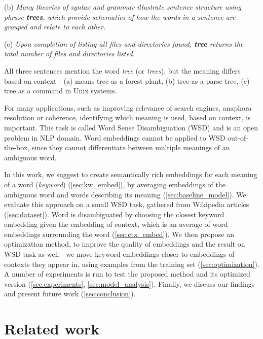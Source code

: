 \documentclass{llncs}
\begin{document}
(b) \textit{Many theories of syntax and grammar illustrate sentence structure using phrase \textbf{trees}, which provide schematics of how the words in a sentence are grouped and relate to each other.}

(c) \textit{Upon completion of listing all files and directories found, \textbf{tree} returns the total number of files and directories listed.}
\medskip

All three sentences mention the word \textit{tree} (or \textit{trees}), but the meaning differs based on context - (a) means tree as a forest plant, (b) tree as a parse tree, (c) tree as a command in Unix systems.

For many applications, such as improving relevance of search engines, anaphora resolution or coherence, identifying which meaning is used, based on context, is important.
This task is called Word Sense Disambiguation (WSD) and is an open problem in NLP domain.
Word embeddings cannot be applied to WSD out-of-the-box, since they cannot differentiate between multiple meanings of an ambiguous word.

In this work, we suggest to create semantically rich embeddings for each meaning of a word (\textit{keyword}) (\ref{sec:kw_embed}), by averaging embeddings of the ambiguous word and words describing its meaning (\ref{sec:baseline_model}).
We evaluate this approach on a small WSD task, gathered from Wikipedia articles (\ref{sec:dataset}).
Word is disambiguated by choosing the closest keyword embedding given the embedding of context, which is an average of word embeddings surrounding the word (\ref{sec:ctx_embed}).
We then propose an optimization method, to improve the quality of embeddings and the result on WSD task as well -  we move keyword embeddings closer to embeddings of contexts they appear in, using examples from the training set (\ref{sec:optimization}).
A number of experiments is run to test the proposed method and its optimized version (\ref{sec:experiments}, \ref{sec:model_analysis}).
Finally, we discuss our findings and present future work (\ref{sec:conclusion}).

\section{Related work}
\label{sec:related_work}

\end{document}
